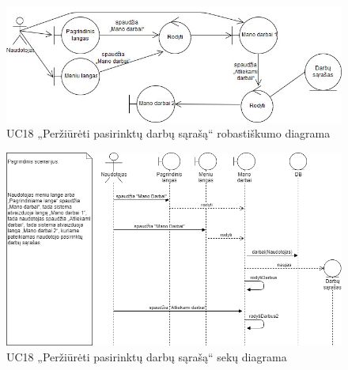 \documentclass{VUMIFPSbakalaurinis}
\begin{document}
\begin{figure}[H]
	\centering
	\includegraphics[scale=0.6]{img/Robustness/UC18}
	\caption{UC18 „Peržiūrėti pasirinktų darbų sąrašą“ robastiškumo diagrama}
	\label{img:uc18rob}
\end{figure}

\begin{figure}[H]
	\centering
	\includegraphics[scale=0.6]{img/Sequence/SD18}
	\caption{UC18 „Peržiūrėti pasirinktų darbų sąrašą“ sekų diagrama}
	\label{img:uc18seq}
\end{figure}
\end{document}
